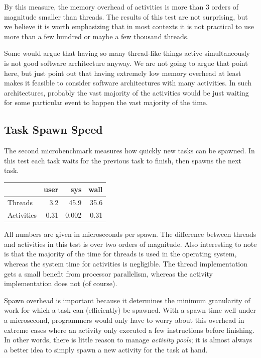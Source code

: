 \documentclass[pldi,10pt,preprint]{sigplanconf-pldi16}
\begin{document}
By this measure, the memory overhead of activities is more than 3 orders of magnitude smaller than threads.
The results of this test are not surprising, but we believe it is worth emphasizing that in most contexts it is not practical to use more than a few hundred or maybe a few thousand threads.

Some would argue that having so many thread-like things active simultaneously is not good software architecture anyway.
We are not going to argue that point here, but just point out that having extremely low memory overhead at least makes it feasible to consider software architectures with many activities.
In such architectures, probably the vast majority of the activities would be just waiting for some particular event to happen the vast majority of the time.

\subsection{Task Spawn Speed}


The second microbenchmark measures how quickly new tasks can be spawned.
In this test each task waits for the previous task to finish, then spawns the next task.

\vspace{1em}
\begin{tabular}{|l|r|r|r|}
  \hline
   & user & sys & wall \\
  \hline
  \hline
  Threads & 3.2 & 45.9 & 35.6 \\
  \hline
  Activities & 0.31 & 0.002 & 0.31 \\
  \hline
\end{tabular}
\vspace{1em}

All numbers are given in microseconds per spawn.
The difference between threads and activities in this test is over two orders of magnitude.
Also interesting to note is that the majority of the time for threads is used in the operating system, whereas the system time for activities is negligible.
The thread implementation gets a small benefit from processor parallelism, whereas the activity implementation does not (of course).

Spawn overhead is important because it determines the minimum granularity of work for which a task can (efficiently) be spawned.
With a spawn time well under a microsecond, programmers would only have to worry about this overhead in extreme cases where an activity only executed a few instructions before finishing.
In other words, there is little reason to manage \emph{activity pools}; it is almost always a better idea to simply spawn a new activity for the task at hand.
\end{document}

